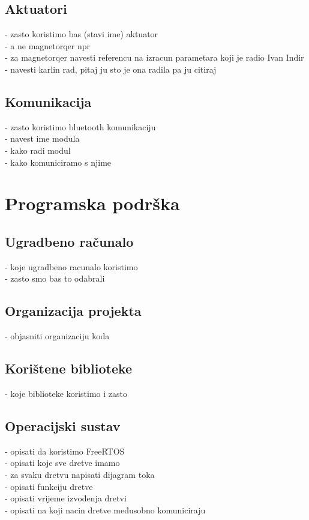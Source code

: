 \documentclass[times, utf8, diplomski, numeric]{templates/template}
\begin{document}
{{        \subsection{Aktuatori}{
            - zasto koristimo bas (stavi ime) aktuator \\
                - a ne magnetorqer npr\\
                - za magnetorqer navesti referencu na izracun parametara koji je radio Ivan Indir\\
                - navesti karlin rad, pitaj ju sto je ona radila pa ju citiraj\\
        }

        \subsection{Komunikacija}{
            - zasto koristimo bluetooth komunikaciju\\
            - navest ime modula\\
            - kako radi modul\\
            - kako komuniciramo s njime\\
        }
    }
    
    \section{Programska podrška}{
        \subsection{Ugradbeno računalo}{
            - koje ugradbeno racunalo koristimo\\
            - zasto smo bas to odabrali\\
        }

        \subsection{Organizacija projekta}{
            - objasniti organizaciju koda\\
        }
        
        \subsection{Korištene biblioteke}{
            - koje biblioteke koristimo i zasto\\
        }

        \subsection{Operacijski sustav}{
            - opisati da koristimo FreeRTOS\\
            - opisati koje sve dretve imamo\\
                - za svaku dretvu napisati dijagram toka\\
                - opisati funkciju dretve\\
                - opisati vrijeme izvođenja dretvi\\
                - opisati na koji nacin dretve međusobno komuniciraju\\
        }

}}
\end{document}
